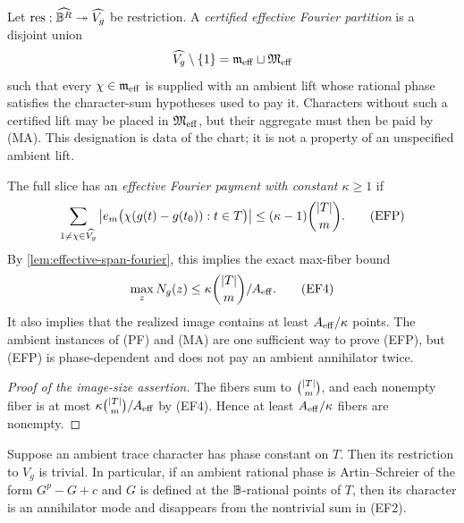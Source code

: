 \documentclass[11pt,a4paper]{amsart}
\numberwithin{equation}{section}
\theoremstyle{remark}
\begin{document}
\begin{definition}
\label{def:effective-major-minor}
Let
\(\operatorname{res}:\widehat{\mathbb B^R}\twoheadrightarrow\widehat{V_g}\)
be restriction.  A \emph{certified effective Fourier partition} is a
disjoint union
\[
 \widehat{V_g}\setminus\{1\}
 =\mathfrak m_{\rm eff}\sqcup\mathfrak M_{\rm eff}
\]
such that every \(\chi\in\mathfrak m_{\rm eff}\) is supplied with an
ambient lift whose rational phase satisfies the character-sum hypotheses
used to pay it.  Characters without such a certified lift may be placed in
\(\mathfrak M_{\rm eff}\), but their aggregate must then be paid by
\textup{(MA)}.  This designation is data of the chart; it is not a
property of an unspecified ambient lift.
\end{definition}

\begin{definition}
\label{def:effective-fourier-payment}
The full slice has an \emph{effective Fourier payment with constant
\(\kappa\ge1\)} if
\[
 \sum_{1\ne\chi\in\widehat{V_g}}
 \left|e_m\bigl(\chi(g(t)-g(t_0)):t\in T\bigr)\right|
 \le (\kappa-1)\binom{\lvert T\rvert}m.                    \tag{EFP}
\]
By \cref{lem:effective-span-fourier}, this implies the exact max-fiber
bound
\[
               \max_zN_g(z)\le
               \kappa\binom{\lvert T\rvert}m/A_{\rm eff}. \tag{EF4}
\]
It also implies that the realized image contains at least
\(A_{\rm eff}/\kappa\) points.  The ambient instances of \textup{(PF)}
and \textup{(MA)} are one sufficient way to prove \textup{(EFP)}, but
\textup{(EFP)} is phase-dependent and does not pay an ambient annihilator
twice.
\end{definition}

\begin{proof}[Proof of the image-size assertion]
The fibers sum to \(\binom{\lvert T\rvert}m\), and each nonempty fiber is at most
\(\kappa\binom{\lvert T\rvert}m/A_{\rm eff}\) by \textup{(EF4)}.
Hence at least \(A_{\rm eff}/\kappa\) fibers are nonempty.
\end{proof}

\begin{lemma}
\label{lem:constant-modes-annihilator}
Suppose an ambient trace character has phase constant on \(T\).  Then its
restriction to \(V_g\) is trivial.  In particular, if an ambient rational
phase is Artin--Schreier of the form \(G^p-G+c\) and \(G\) is defined at
the \(\mathbb B\)-rational points of \(T\), then its character is an annihilator
mode and disappears from the nontrivial sum in \textup{(EF2)}.
\end{lemma}
\end{document}
